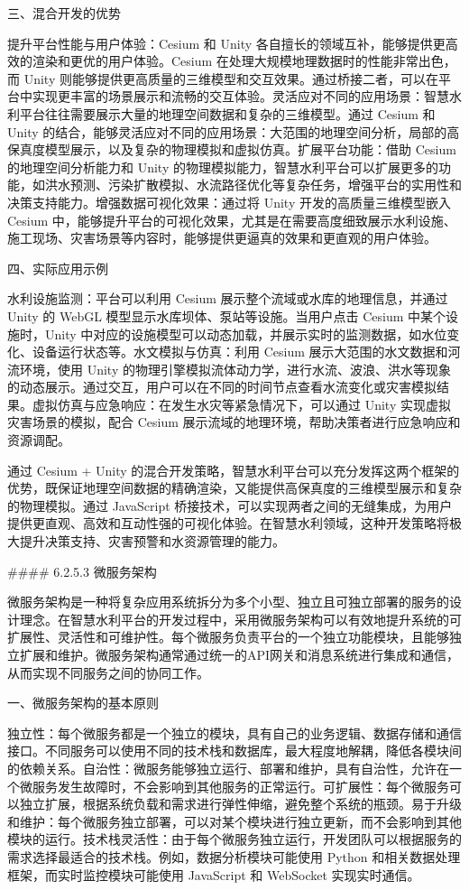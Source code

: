 三、混合开发的优势

提升平台性能与用户体验：Cesium 和 Unity 各自擅长的领域互补，能够提供更高效的渲染和更优的用户体验。Cesium 在处理大规模地理数据时的性能非常出色，而 Unity 则能够提供更高质量的三维模型和交互效果。通过桥接二者，可以在平台中实现更丰富的场景展示和流畅的交互体验。灵活应对不同的应用场景：智慧水利平台往往需要展示大量的地理空间数据和复杂的三维模型。通过 Cesium 和 Unity 的结合，能够灵活应对不同的应用场景：大范围的地理空间分析，局部的高保真度模型展示，以及复杂的物理模拟和虚拟仿真。扩展平台功能：借助 Cesium 的地理空间分析能力和 Unity 的物理模拟能力，智慧水利平台可以扩展更多的功能，如洪水预测、污染扩散模拟、水流路径优化等复杂任务，增强平台的实用性和决策支持能力。增强数据可视化效果：通过将 Unity 开发的高质量三维模型嵌入 Cesium 中，能够提升平台的可视化效果，尤其是在需要高度细致展示水利设施、施工现场、灾害场景等内容时，能够提供更逼真的效果和更直观的用户体验。

四、实际应用示例

水利设施监测：平台可以利用 Cesium 展示整个流域或水库的地理信息，并通过 Unity 的 WebGL 模型显示水库坝体、泵站等设施。当用户点击 Cesium 中某个设施时，Unity 中对应的设施模型可以动态加载，并展示实时的监测数据，如水位变化、设备运行状态等。水文模拟与仿真：利用 Cesium 展示大范围的水文数据和河流环境，使用 Unity 的物理引擎模拟流体动力学，进行水流、波浪、洪水等现象的动态展示。通过交互，用户可以在不同的时间节点查看水流变化或灾害模拟结果。虚拟仿真与应急响应：在发生水灾等紧急情况下，可以通过 Unity 实现虚拟灾害场景的模拟，配合 Cesium 展示流域的地理环境，帮助决策者进行应急响应和资源调配。

通过 Cesium + Unity 的混合开发策略，智慧水利平台可以充分发挥这两个框架的优势，既保证地理空间数据的精确渲染，又能提供高保真度的三维模型展示和复杂的物理模拟。通过 JavaScript 桥接技术，可以实现两者之间的无缝集成，为用户提供更直观、高效和互动性强的可视化体验。在智慧水利领域，这种开发策略将极大提升决策支持、灾害预警和水资源管理的能力。

\#\#\#\# 6.2.5.3 微服务架构

微服务架构是一种将复杂应用系统拆分为多个小型、独立且可独立部署的服务的设计理念。在智慧水利平台的开发过程中，采用微服务架构可以有效地提升系统的可扩展性、灵活性和可维护性。每个微服务负责平台的一个独立功能模块，且能够独立扩展和维护。微服务架构通常通过统一的API网关和消息系统进行集成和通信，从而实现不同服务之间的协同工作。

一、微服务架构的基本原则

独立性：每个微服务都是一个独立的模块，具有自己的业务逻辑、数据存储和通信接口。不同服务可以使用不同的技术栈和数据库，最大程度地解耦，降低各模块间的依赖关系。自治性：微服务能够独立运行、部署和维护，具有自治性，允许在一个微服务发生故障时，不会影响到其他服务的正常运行。可扩展性：每个微服务可以独立扩展，根据系统负载和需求进行弹性伸缩，避免整个系统的瓶颈。易于升级和维护：每个微服务独立部署，可以对某个模块进行独立更新，而不会影响到其他模块的运行。技术栈灵活性：由于每个微服务独立运行，开发团队可以根据服务的需求选择最适合的技术栈。例如，数据分析模块可能使用 Python 和相关数据处理框架，而实时监控模块可能使用 JavaScript 和 WebSocket 实现实时通信。

